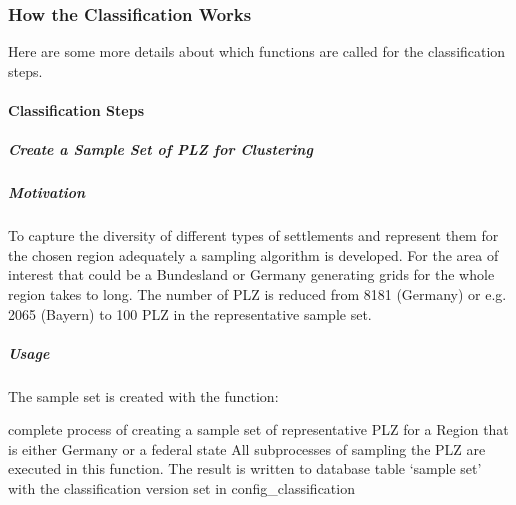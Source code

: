 \documentclass[letterpaper,10pt,english]{sphinxmanual}
\begin{document}
\subsubsection{How the Classification Works}
\label{\detokenize{classification/index:how-the-classification-works}}
\begin{DUlineblock}{0em}
\item[] Here are some more details about which functions are called for the classification steps.
\end{DUlineblock}

\sphinxstepscope


\paragraph{Classification Steps}
\label{\detokenize{classification/classification_steps/index:classification-steps}}\label{\detokenize{classification/classification_steps/index::doc}}
\sphinxstepscope


\subparagraph{Create a Sample Set of PLZ for Clustering}
\label{\detokenize{classification/classification_steps/sampling:create-a-sample-set-of-plz-for-clustering}}\label{\detokenize{classification/classification_steps/sampling::doc}}

\subparagraph{Motivation}
\label{\detokenize{classification/classification_steps/sampling:motivation}}
\sphinxAtStartPar
To capture the diversity of different types of settlements and represent them for the chosen region adequately a
sampling algorithm is developed. For the area of interest that could be a Bundesland or Germany generating grids for
the whole region takes to long. The number of PLZ is reduced from 8181 (Germany) or e.g. 2065 (Bayern) to 100 PLZ in
the representative sample set.


\subparagraph{Usage}
\label{\detokenize{classification/classification_steps/sampling:usage}}
\sphinxAtStartPar
The sample set is created with the function:

\begin{fulllineitems}
\label{\detokenize{classification/classification_steps/sampling:classification.sampling.sample.create_sample_set}}
\pysigstartsignatures
{}
\pysigstopsignatures
\sphinxAtStartPar
complete process of creating a sample set of representative PLZ for a Region
that is either Germany or a federal state
All subprocesses of sampling the PLZ are executed in this function.
The result is written to database table ‘sample set’ with the classification version set in
config\_classification

\end{fulllineitems}
\end{document}
